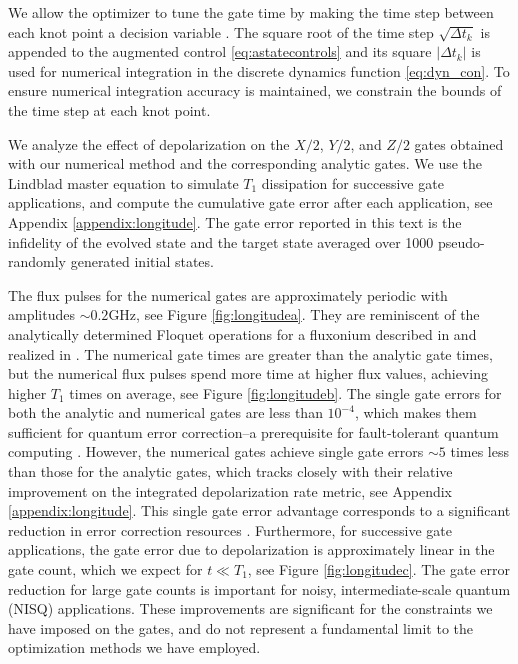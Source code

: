 We allow the optimizer to tune the gate time by
making the time step between each knot point
a decision variable \cite{howell2019altro}. 
The square root of the time step $\sqrt{\Delta t_{k}}$
is appended to the augmented control \eqref{eq:astatecontrols}
and its square $\lvert \Delta t_{k} \rvert$ is used
for numerical integration in the discrete dynamics function \eqref{eq:dyn_con}.
To ensure numerical
integration accuracy is maintained, we constrain
the bounds of the time step at each knot point.

We analyze the effect of depolarization on
the $X/2$, $Y/2$, and $Z/2$ gates obtained with
our numerical method and the corresponding analytic gates. We
use the Lindblad master equation to simulate $T_{1}$ dissipation for successive
gate applications, and compute the cumulative gate error
after each application, see Appendix \ref{appendix:longitude}.
The gate error reported in this text is the infidelity
of the evolved state and the target state averaged over 1000 pseudo-randomly
generated initial states.

The flux pulses for the numerical gates
are approximately periodic
with amplitudes $\sim 0.2 \textrm{GHz}$, see Figure \ref{fig:longitudea}.
They are reminiscent of the analytically determined Floquet operations
for a fluxonium described in \cite{huang2020engineering}
and realized in \cite{mundada2020floquet}.
The numerical gate times are greater
than the analytic gate times, but the
numerical flux pulses
spend more time at higher flux values, achieving higher $T_{1}$ times on average,
see Figure \ref{fig:longitudeb}.
The single gate errors for both the analytic and numerical gates are
less than $10^{-4}$, which makes them sufficient for quantum error correction--a
prerequisite for fault-tolerant quantum
computing \cite{aharonov2008fault, knill2005quantum, gottesman1997stabilizer}.
However, the numerical gates achieve single gate errors
$\sim 5$ times less than those for the analytic gates,
which tracks closely with their relative improvement
on the integrated depolarization rate metric, see Appendix \ref{appendix:longitude}.
This single gate error advantage corresponds to a
significant reduction in error correction resources
\cite{paetznick2014resource, suchara2013comparing}.
Furthermore, for successive gate applications,
the gate error due to depolarization is approximately linear
in the gate count, which we expect for $t \ll T_{1}$, see Figure \ref{fig:longitudec}.
The gate error reduction for large gate counts is
important for noisy, intermediate-scale quantum (NISQ)
applications. These improvements are significant for the constraints
we have imposed on the gates,
and do not represent a fundamental limit to the optimization
methods we have employed.

